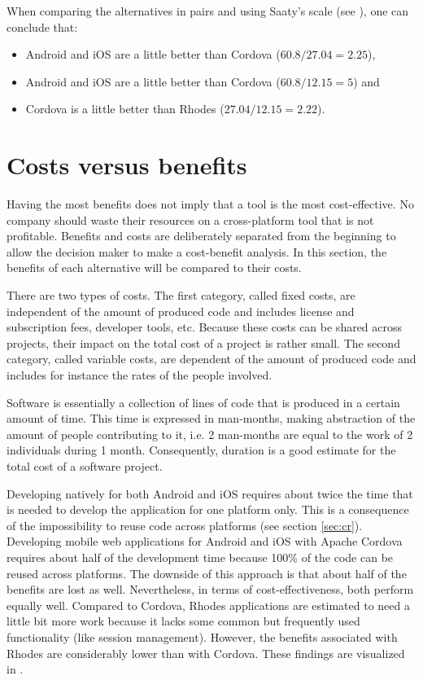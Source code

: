 When comparing the alternatives in pairs and using Saaty's scale (see ), one can conclude that:
\begin{itemize}
    \item Android and iOS are a little better than Cordova ($60.8/27.04 = 2.25$),
    \item Android and iOS are a little better than Cordova ($60.8 / 12.15 = 5$) and
    \item Cordova is a little better than Rhodes ($27.04 / 12.15 = 2.22$).
\end{itemize}

\section{Costs versus benefits}

Having the most benefits does not imply that a tool is the most cost-effective. No company should waste their resources on a cross-platform tool that is not profitable. Benefits and costs are deliberately separated from the beginning to allow the decision maker to make a cost-benefit analysis. In this section, the benefits of each alternative will be compared to their costs.

There are two types of costs. The first category, called fixed costs, are independent of the amount of produced code and includes license and subscription fees, developer tools, etc. Because these costs can be shared across projects, their impact on the total cost of a project is rather small. The second category, called variable costs, are dependent of the amount of produced code and includes for instance the rates of the people involved.

Software is essentially a collection of lines of code that is produced in a certain amount of time. This time is expressed in man-months, making abstraction of the amount of people contributing to it, i.e. 2 man-months are equal to the work of 2 individuals during 1 month. Consequently, duration is a good estimate for the total cost of a software project.

Developing natively for both Android and iOS requires about twice the time that is needed to develop the application for one platform only. This is a consequence of the impossibility to reuse code across platforms (see section \ref{sec:cr}). Developing mobile web applications for Android and iOS with Apache Cordova requires about half of the development time because 100\% of the code can be reused across platforms. The downside of this approach is that about half of the benefits are lost as well. Nevertheless, in terms of cost-effectiveness, both perform equally well. Compared to Cordova, Rhodes applications are estimated to need a little bit more work because it lacks some common but frequently used functionality (like session management). However, the benefits associated with Rhodes are considerably lower than with Cordova. These findings are visualized in .

